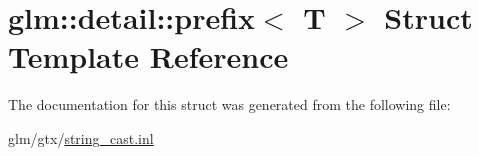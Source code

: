 \hypertarget{structglm_1_1detail_1_1prefix}{\section{glm\-:\-:detail\-:\-:prefix$<$ T $>$ Struct Template Reference}
\label{structglm_1_1detail_1_1prefix}
}


The documentation for this struct was generated from the following file\-:\begin{DoxyCompactItemize}
\item 
glm/gtx/\hyperlink{string__cast_8inl}{string\-\_\-cast.\-inl}\end{DoxyCompactItemize}

